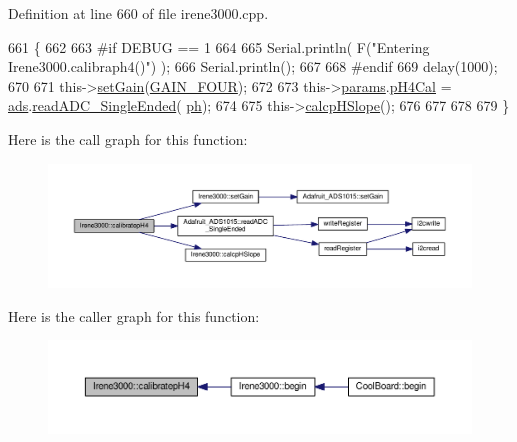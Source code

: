 Definition at line 660 of file irene3000.\+cpp.


\begin{DoxyCode}
661 \{
662 
663 \textcolor{preprocessor}{#if DEBUG == 1 }
664 
665     Serial.println( F(\textcolor{stringliteral}{"Entering Irene3000.calibraph4()"}) );
666     Serial.println();
667 
668 \textcolor{preprocessor}{#endif }
669     delay(1000);
670 
671     this->\hyperlink{class_irene3000_aff7c5da186b388e7272e63ff88a20c34}{setGain}(\hyperlink{_cool_adafruit___a_d_s1015_8h_a3d6c0e15829a207b9155890811fa4781a33fa5521f4e806b7438052fcdbbf8660}{GAIN\_FOUR});
672 
673     this->\hyperlink{class_irene3000_a136585a5ee7f9ac6ab52175fa153f8e3}{params}.\hyperlink{struct_irene3000_1_1parameters___t_a1144de6fb54eb3e1dd2a3d8c2afc97dc}{pH4Cal} =  \hyperlink{class_irene3000_a1215e77ba761c9908d80d691f149e135}{ads}.\hyperlink{class_adafruit___a_d_s1015_a40f38b9e1f3ec397c0670dd632510235}{readADC\_SingleEnded}(
      \hyperlink{_irene3000_8h_af771ceafe0e6524dd8497d4305dfe778}{ph});
674 
675     this->\hyperlink{class_irene3000_a81f6a79e546679692053f7ac1af49613}{calcpHSlope}();
676 
677 
678 
679 \}
\end{DoxyCode}
Here is the call graph for this function\+:\nopagebreak
\begin{figure}[H]
\begin{center}
\leavevmode
\includegraphics[width=350pt]{d6/d03/class_irene3000_aa140dd026922a04981edfd04d46cabbe_cgraph}
\end{center}
\end{figure}
Here is the caller graph for this function\+:\nopagebreak
\begin{figure}[H]
\begin{center}
\leavevmode
\includegraphics[width=350pt]{d6/d03/class_irene3000_aa140dd026922a04981edfd04d46cabbe_icgraph}
\end{center}
\end{figure}
\mbox{\label{class_irene3000_a1d3299202e4cb7afcff9c9e3e95d94c1}} 

